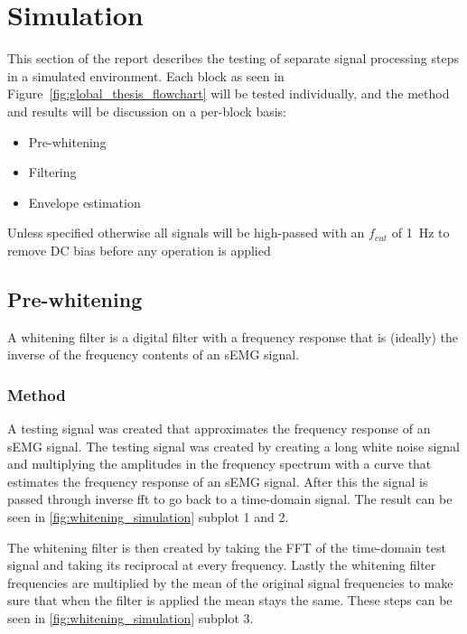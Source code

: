 \chapter{Simulation}
This section of the report describes the testing of separate signal processing steps in a simulated environment. Each block as seen in Figure~\ref{fig:global_thesis_flowchart} will be tested individually, and the method and results will be discussion on a per-block basis:
\begin{itemize}
    \item Pre-whitening
    \item Filtering
    \item Envelope estimation
\end{itemize}

Unless specified otherwise all signals will be high-passed with an $f_{cut}$ of \SI{1}{\hertz} to remove DC bias before any operation is applied

\section{Pre-whitening}\label{sec:whitening}
A whitening filter is a digital filter with a frequency response that is (ideally) the inverse of the frequency contents of an sEMG signal. 

\subsection{Method}
A testing signal was created that approximates the frequency response of an sEMG signal. The testing signal was created by creating a long white noise signal and multiplying the amplitudes in the frequency spectrum with a curve that estimates the frequency response of an sEMG signal. After this the signal is passed through inverse fft to go back to a time-domain signal. The result can be seen in \ref{fig:whitening_simulation} subplot 1 and 2.

The whitening filter is then created by taking the FFT of the time-domain test signal and taking its reciprocal at every frequency. Lastly the whitening filter frequencies are multiplied by the mean of the original signal frequencies to make sure that when the filter is applied the mean stays the same. These steps can be seen in \ref{fig:whitening_simulation} subplot 3. 

